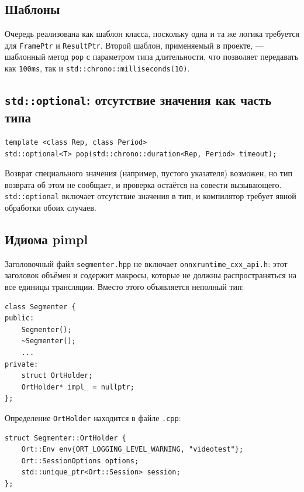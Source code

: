 \documentclass[11pt,a4paper]{article}
\theoremstyle{definition}
\theoremstyle{remark}
\begin{document}
\subsection{Шаблоны}

Очередь реализована как шаблон класса, поскольку одна и та же логика
требуется для \texttt{FramePtr} и \texttt{ResultPtr}. Второй шаблон,
применяемый в проекте, --- шаблонный метод \texttt{pop} с параметром типа
длительности, что позволяет передавать как \texttt{100ms}, так и
\texttt{std::chrono::milliseconds(10)}.

\subsection{\texttt{std::optional}: отсутствие значения как часть типа}

\begin{lstlisting}
template <class Rep, class Period>
std::optional<T> pop(std::chrono::duration<Rep, Period> timeout);
\end{lstlisting}

Возврат специального значения (например, пустого указателя) возможен, но тип
возврата об этом не сообщает, и проверка остаётся на совести вызывающего.
\texttt{std::optional} включает отсутствие значения в тип, и компилятор
требует явной обработки обоих случаев.

\subsection{Идиома pimpl}

Заголовочный файл \texttt{segmenter.hpp} не включает
\texttt{onnxruntime\_cxx\_api.h}: этот заголовок объёмен и содержит макросы,
которые не должны распространяться на все единицы трансляции. Вместо этого
объявляется неполный тип:

\begin{lstlisting}
class Segmenter {
public:
    Segmenter();
    ~Segmenter();
    ...
private:
    struct OrtHolder;
    OrtHolder* impl_ = nullptr;
};
\end{lstlisting}

Определение \texttt{OrtHolder} находится в файле \texttt{.cpp}:

\begin{lstlisting}
struct Segmenter::OrtHolder {
    Ort::Env env{ORT_LOGGING_LEVEL_WARNING, "videotest"};
    Ort::SessionOptions options;
    std::unique_ptr<Ort::Session> session;
};
\end{lstlisting}
\end{document}
